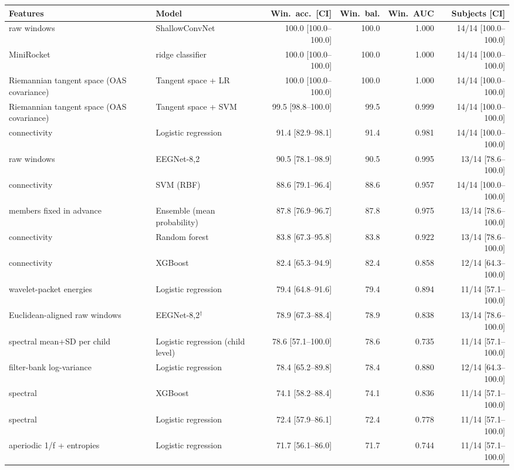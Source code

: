\scriptsize
\begin{tabular}{llrrrr}
\hline
Features & Model & Win.\ acc.\ [CI] & Win.\ bal. & Win.\ AUC & Subjects [CI] \\
\hline
raw windows & ShallowConvNet & 100.0 [100.0--100.0] & 100.0 & 1.000 & 14/14 [100.0--100.0] \\
MiniRocket & ridge classifier & 100.0 [100.0--100.0] & 100.0 & 1.000 & 14/14 [100.0--100.0] \\
Riemannian tangent space (OAS covariance) & Tangent space + LR & 100.0 [100.0--100.0] & 100.0 & 1.000 & 14/14 [100.0--100.0] \\
Riemannian tangent space (OAS covariance) & Tangent space + SVM & 99.5 [98.8--100.0] & 99.5 & 0.999 & 14/14 [100.0--100.0] \\
connectivity & Logistic regression & 91.4 [82.9--98.1] & 91.4 & 0.981 & 14/14 [100.0--100.0] \\
raw windows & EEGNet-8,2 & 90.5 [78.1--98.9] & 90.5 & 0.995 & 13/14 [78.6--100.0] \\
connectivity & SVM (RBF) & 88.6 [79.1--96.4] & 88.6 & 0.957 & 14/14 [100.0--100.0] \\
members fixed in advance & Ensemble (mean probability) & 87.8 [76.9--96.7] & 87.8 & 0.975 & 13/14 [78.6--100.0] \\
connectivity & Random forest & 83.8 [67.3--95.8] & 83.8 & 0.922 & 13/14 [78.6--100.0] \\
connectivity & XGBoost & 82.4 [65.3--94.9] & 82.4 & 0.858 & 12/14 [64.3--100.0] \\
wavelet-packet energies & Logistic regression & 79.4 [64.8--91.6] & 79.4 & 0.894 & 11/14 [57.1--100.0] \\
Euclidean-aligned raw windows & EEGNet-8,2$^\dagger$ & 78.9 [67.3--88.4] & 78.9 & 0.838 & 13/14 [78.6--100.0] \\
spectral mean+SD per child & Logistic regression (child level) & 78.6 [57.1--100.0] & 78.6 & 0.735 & 11/14 [57.1--100.0] \\
filter-bank log-variance & Logistic regression & 78.4 [65.2--89.8] & 78.4 & 0.880 & 12/14 [64.3--100.0] \\
spectral & XGBoost & 74.1 [58.2--88.4] & 74.1 & 0.836 & 11/14 [57.1--100.0] \\
spectral & Logistic regression & 72.4 [57.9--86.1] & 72.4 & 0.778 & 11/14 [57.1--100.0] \\
aperiodic 1/f + entropies & Logistic regression & 71.7 [56.1--86.0] & 71.7 & 0.744 & 11/14 [57.1--100.0] \\

\end{tabular}
